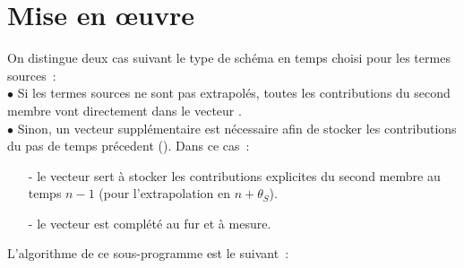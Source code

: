 \section*{Mise en \oe uvre}
On distingue deux cas suivant le type de schéma en temps choisi pour les termes sources~:
\\
$\bullet$ Si les termes sources ne sont pas extrapolés, toutes les contributions
du second membre vont directement dans le vecteur
.\\
$\bullet$ Sinon, un vecteur supplémentaire est nécessaire afin de stocker les
contributions du pas de temps précedent (). Dans ce cas~:
\begin{itemize}
\item [-] le vecteur  sert à stocker les contributions explicites du
second membre au temps $n-1$ (pour l'extrapolation en $n+\theta_S$).
\item [-] le vecteur  est complété au fur et à mesure.
\\
\end{itemize}
L'algorithme de ce sous-programme est le suivant~:
